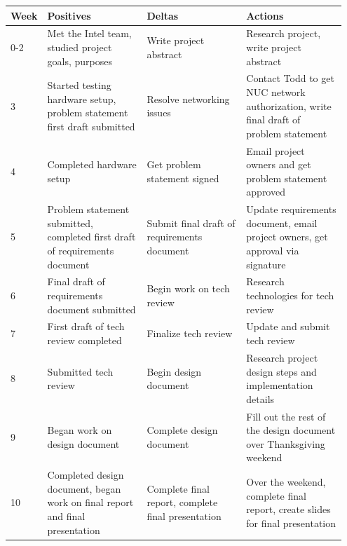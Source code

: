 \documentclass[10pt,onecolumn,journal,draftclsnofoot]{IEEEtran}
\begin{document}
\begin{center}
	\begin{tabular}{| p{0.05\linewidth} | p{0.3\linewidth} | p{0.3\linewidth} |
			p{0.3\linewidth} |}\hline
		Week & Positives & Deltas & Actions \\ \hline

		0-2 & Met the Intel team, studied project goals, purposes  &
			Write project abstract & Research project, write project
			abstract \\ \hline

		3 & Started testing hardware setup, problem statement
			first draft submitted & Resolve networking issues & 
			Contact Todd to get NUC network authorization, write
			final draft of problem statement\\ \hline

		4 & Completed hardware setup  & Get problem statement signed  &
			Email project owners and get problem statement approved
			\\ \hline

		5 & Problem statement submitted, completed first draft
			of requirements document & Submit final draft of
			requirements document & Update requirements document,
			email project owners, get approval via signature \\ 
			\hline

		6 & Final draft of requirements document submitted & Begin work
			on tech review & Research technologies for tech review 
			\\ \hline

		7 & First draft of tech review completed & Finalize tech review
			& Update and submit tech review \\ \hline

		8 & Submitted tech review & Begin design document & Research 
			project design steps and implementation details\\ \hline
		
		9 & Began work on design document & Complete design document  &
			Fill out the rest of the design document over 
			Thanksgiving weekend \\ \hline

		10 & Completed design document, began work on final report and
			final presentation & Complete final report, complete
			final presentation & Over the weekend, complete final
			report, create slides for final presentation\\ \hline

	\end{tabular}
\end{center}
\end{document}
